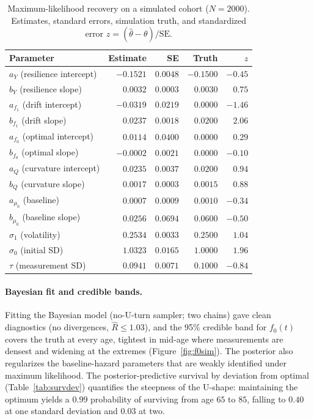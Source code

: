 \documentclass[review,3p,times]{elsarticle}
\newcommand{\fzero}{f_0}
\begin{document}
\begin{table}[t]\centering
\caption{Maximum-likelihood recovery on a simulated cohort ($N=2000$). Estimates,
standard errors, simulation truth, and standardized error
$z=(\hat\theta-\theta)/\mathrm{SE}$.}
\label{tab:recovery}
\begin{tabular}{lrrrr}
\toprule
Parameter & Estimate & SE & Truth & $z$ \\
\midrule
$a_Y$ (resilience intercept)      & $-0.1521$ & $0.0048$ & $-0.1500$ & $-0.45$\\
$b_Y$ (resilience slope)          & $ 0.0032$ & $0.0003$ & $ 0.0030$ & $ 0.75$\\
$a_{f_1}$ (drift intercept)       & $-0.0319$ & $0.0219$ & $ 0.0000$ & $-1.46$\\
$b_{f_1}$ (drift slope)           & $ 0.0237$ & $0.0018$ & $ 0.0200$ & $ 2.06$\\
$a_{f_0}$ (optimal intercept)     & $ 0.0114$ & $0.0400$ & $ 0.0000$ & $ 0.29$\\
$b_{f_0}$ (optimal slope)         & $-0.0002$ & $0.0021$ & $ 0.0000$ & $-0.10$\\
$a_Q$ (curvature intercept)       & $ 0.0235$ & $0.0037$ & $ 0.0200$ & $ 0.94$\\
$b_Q$ (curvature slope)           & $ 0.0017$ & $0.0003$ & $ 0.0015$ & $ 0.88$\\
$a_{\mu_0}$ (baseline)            & $ 0.0007$ & $0.0009$ & $ 0.0010$ & $-0.34$\\
$b_{\mu_0}$ (baseline slope)      & $ 0.0256$ & $0.0694$ & $ 0.0600$ & $-0.50$\\
$\sigma_1$ (volatility)           & $ 0.2534$ & $0.0033$ & $ 0.2500$ & $ 1.04$\\
$\sigma_0$ (initial SD)           & $ 1.0323$ & $0.0165$ & $ 1.0000$ & $ 1.96$\\
$\tau$ (measurement SD)           & $ 0.0941$ & $0.0071$ & $ 0.1000$ & $-0.84$\\
\bottomrule
\end{tabular}
\end{table}

\paragraph{Bayesian fit and credible bands.} Fitting the Bayesian model (no-U-turn
sampler; two chains) gave clean diagnostics (no divergences, $\widehat R\le1.03$),
and the 95\% credible band for $\fzero(t)$ covers the truth at every age, tightest
in mid-age where measurements are densest and widening at the extremes
(Figure~\ref{fig:f0sim}). The posterior also regularizes the baseline-hazard
parameters that are weakly identified under maximum likelihood. The
posterior-predictive survival by deviation from optimal (Table~\ref{tab:survdev})
quantifies the steepness of the U-shape: maintaining the optimum yields a
$0.99$ probability of surviving from age $65$ to $85$, falling to $0.40$ at one
standard deviation and $0.03$ at two.
\end{document}
